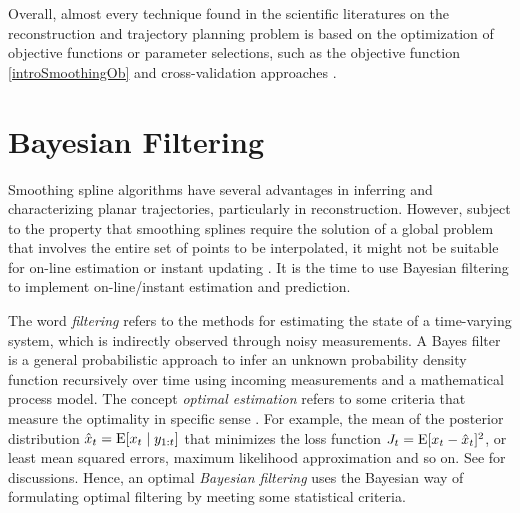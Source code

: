 %

Overall, almost every technique found in the scientific literatures on the reconstruction and trajectory planning problem is based on the optimization of objective functions or parameter selections, such as the objective function \eqref{introSmoothingOb} and cross-validation approaches \citep{gasparetto2007new}. 



\section{Bayesian Filtering}

Smoothing spline algorithms have several advantages in inferring and characterizing planar trajectories, particularly in reconstruction. However, subject to the property that smoothing splines require the solution of a global problem that involves the entire set of points to be interpolated, it might not be suitable for on-line estimation or instant updating \citep{biagiotti2013online}. It is the time to use Bayesian filtering to implement on-line/instant estimation and prediction. 

The word \textit{filtering} refers to the methods for estimating the state of a time-varying system, which is indirectly observed through noisy measurements. A Bayes filter is a general probabilistic approach to infer an unknown probability density function recursively over time using incoming measurements and a mathematical process model. The concept \textit{optimal estimation} refers to some criteria that measure the optimality in specific sense \citep{anderson1979optimal}. 
For example, the mean of the posterior distribution $\hat{x}_t =\mathrm{E}\lbrack x_t\mid y_{1:t}\rbrack$ that minimizes the loss function $J_t=\mathrm{E}\lbrack x_t-\hat{x}_t\rbrack^2$, 
or least mean squared errors, maximum likelihood approximation and so on. See \eg \cite{chen2003bayesian, sarkka2013bayesian} for discussions. Hence, an optimal \textit{Bayesian filtering} uses the Bayesian way of formulating optimal filtering by meeting some statistical criteria. 

